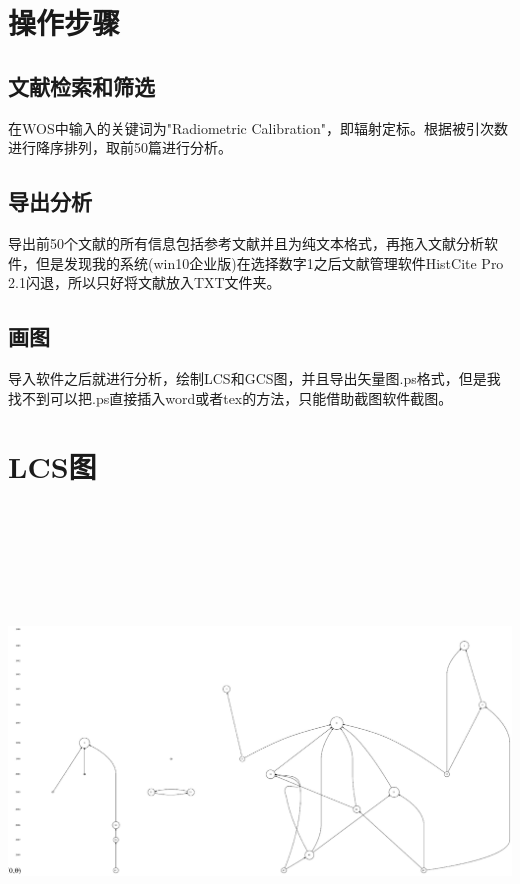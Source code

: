 \documentclass[UTF8]{ctexart}
\begin{document}
	\section{操作步骤}
	\subsection{文献检索和筛选}
在WOS中输入的关键词为"Radiometric Calibration"，即辐射定标。根据被引次数进行降序排列，取前50篇进行分析。
	\subsection{导出分析}
导出前50个文献的所有信息包括参考文献并且为纯文本格式，再拖入文献分析软件，但是发现我的系统(win10企业版)在选择数字1之后文献管理软件HistCite Pro 2.1闪退，所以只好将文献放入TXT文件夹。
	\subsection{画图}
导入软件之后就进行分析，绘制LCS和GCS图，并且导出矢量图.ps格式，但是我找不到可以把.ps直接插入word或者tex的方法，只能借助截图软件截图。
	\section{LCS图}
		\begin{center}
			\includegraphics[width=18cm,height=13cm]{LCS.eps}
		\end{center}
\end{document}
